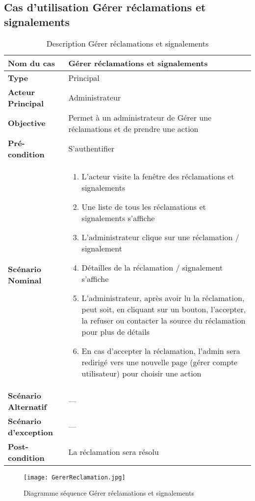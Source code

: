 \subsection{Cas d'utilisation Gérer réclamations et signalements}
\renewcommand{\arraystretch}{2}
\begin{center}
	\begin{table}[H]
		\centering
		\tiny{\begin{tabular}{ | l | m{0.51\textheight}|}
				\hline
				\rowcolor[HTML]{06a8ed}
				\textbf{Nom du cas} & Gérer réclamations et signalements \\
				\hline\hline
				\cellcolor[HTML]{99ccff} \textbf{Type} & Principal \\
				\hline
				\cellcolor[HTML]{99ccff} \textbf{Acteur Principal} & Administrateur\\
				\hline
				\cellcolor[HTML]{99ccff} \textbf{Objective} & Permet à un administrateur de Gérer une réclamations et de prendre une action\\
				\hline
				\cellcolor[HTML]{99ccff} \textbf{Pré-condition} & S'authentifier\\
				\hline
				\cellcolor[HTML]{99ccff} \textbf{Scénario Nominal} & \parbox{0.43\textheight}{
					\begin{enumerate}
						\vspace{0.01\textheight}
						\item L’acteur visite la fenêtre des réclamations et signalements
						\item Une liste de tous les réclamations et signalements s’affiche
						\item L’administrateur clique sur une réclamation / signalement
						\item Détailles de la réclamation / signalement s’affiche
						\item L’administrateur, après avoir lu la réclamation, peut soit, en cliquant sur un bouton, l’accepter, la refuser ou contacter la source du réclamation pour plus de détails
						\item En cas d’accepter la réclamation, l’admin sera redirigé vers une nouvelle page (gérer compte utilisateur) pour choisir une action  
						\vspace{0.01\textheight}
				\end{enumerate}}\\
				\hline
				 \textbf{Scénario Alternatif} & --- \\
				\hline
				 \textbf{Scénario d'exception} & --- \\
				\hline
				 \textbf{Post-condition} & La réclamation sera résolu\\
				\hline
		\end{tabular}}
		\caption{Description Gérer réclamations et signalements}
		\label{table:gerer reclamation}
	\end{table}
	\begin{figure}[H]
		\centering
		\texttt{[image: GererReclamation.jpg]}
		\caption{Diagramme séquence Gérer réclamations et signalements}
		\label{fig:seq gere reclamation}
	\end{figure}
\end{center}